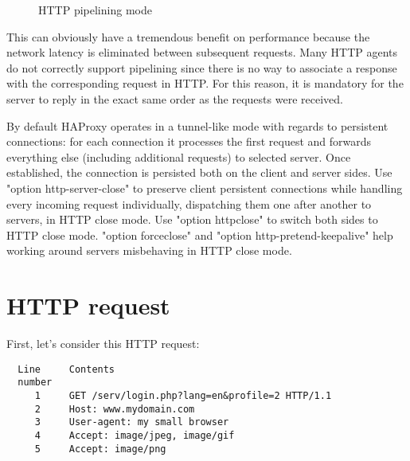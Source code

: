 \begin{figure}[!h]
\centering
{}

\caption{HTTP pipelining mode}
\label{fig:http_pipelining}
\end{figure}

This can obviously have a tremendous benefit on performance because the network
latency is eliminated between subsequent requests. Many HTTP agents do not
correctly support pipelining since there is no way to associate a response with
the corresponding request in HTTP. For this reason, it is mandatory for the
server to reply in the exact same order as the requests were received.

By default HAProxy operates in a tunnel-like mode with regards to persistent
connections: for each connection it processes the first request and forwards
everything else (including additional requests) to selected server. Once
established, the connection is persisted both on the client and server
sides. Use "option http-server-close" to preserve client persistent connections
while handling every incoming request individually, dispatching them one after
another to servers, in HTTP close mode. Use "option httpclose" to switch both
sides to HTTP close mode. "option forceclose" and "option
http-pretend-keepalive" help working around servers misbehaving in HTTP close
mode.


\section{HTTP request}

First, let's consider this HTTP request:
\begin{verbatim}
  Line     Contents
  number
     1     GET /serv/login.php?lang=en&profile=2 HTTP/1.1
     2     Host: www.mydomain.com
     3     User-agent: my small browser
     4     Accept: image/jpeg, image/gif
     5     Accept: image/png
\end{verbatim}

